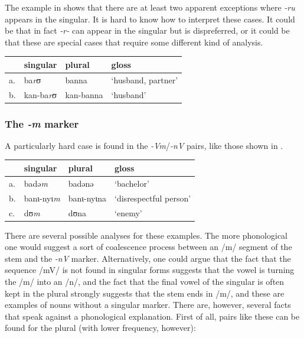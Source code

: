 The example in  shows that there are at least two apparent exceptions where \textit{-ru} appears in the singular. It is hard to know how to interpret these cases. It could be that in fact \textit{-r-} can appear in the singular but is dispreferred, or it could be that these are special cases that require some different kind of analysis.

\begin{exe}
    \ex \label{rusg-kasem-2}
    \begin{tabular}[t]{llll}
      & singular & plural    & gloss              \\
      \midrule
      a. & ba\textit{rʊ}     & banna     & `husband, partner' \\
      b. & kan-ba\textit{rʊ} & kan-banna & `husband'          \\
    \end{tabular}
\end{exe}

\subsubsection{The \textit{-m} marker}

\largerpage 
A particularly hard case is found in the \textit{-Vm}/\textit{-nV} pairs, like those shown in .

\begin{exe}
    \ex \label{nm-exe}
    \begin{tabular}[t]{llll}
      & singular  & plural     & gloss                  \\
      \midrule
      a. & badə\textit{m}     & badənə     & `bachelor'             \\
      b. & banɩ-nyɩ\textit{m} & banɩ-nyɩna & `disrespectful person' \\
      c. & dʊ\textit{m}       & dʊna       & `enemy'                \\
    \end{tabular}
\end{exe}

There are several possible analyses for these examples. The more phonological one would suggest a sort of coalescence process between an /m/ segment of the stem and the \textit{-nV} marker. Alternatively, one could argue that the fact that the sequence /mV/ is not found in singular forms suggests that the vowel is turning the /m/ into an /n/, and the fact that the final vowel of the singular is often kept in the plural strongly suggests that the stem ends in /m/, and these are examples of nouns without a singular marker. There are, however, several facts that speak against a phonological explanation. First of all, pairs like these can be found for the plural (with lower frequency, however):


